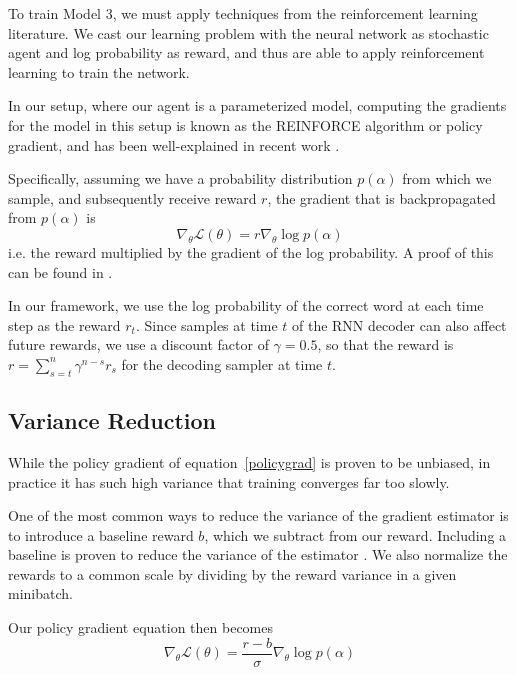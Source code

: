 \documentclass[11pt]{report}
\begin{document}
To train Model 3, we must apply techniques from the reinforcement learning literature. We cast our learning problem with the neural network as stochastic agent and log probability as reward, and thus are able to apply reinforcement learning to train the network.

In our setup, where our agent is a parameterized model, computing the gradients for the model in this setup is known as the REINFORCE algorithm \citep{williams1992reinforce} or policy gradient, and has been well-explained in recent work \citep{mnih2014visualattention, ba2015visualattention, schulman2015backprop}.

Specifically, assuming we have a probability distribution $p(\alpha)$ from which we sample, and subsequently receive reward $r$, the gradient that is backpropagated from $p(\alpha)$ is
\begin{equation}
\label{policygrad}
\nabla_\theta \mathcal{L}(\theta) = r \nabla_\theta \log p(\alpha)
\end{equation}
i.e. the reward multiplied by the gradient of the log probability. A proof of this can be found in \cite{williams1992reinforce}.

In our framework, we use the log probability of the correct word at each time step as the reward $r_t$. Since samples at time $t$ of the RNN decoder can also affect future rewards, we use a discount factor of $\gamma = 0.5$, so that the reward is $r = \sum_{s = t}^n \gamma^{n-s}r_s$ for the decoding sampler at time $t$.

\subsection{Variance Reduction}

While the policy gradient of equation~\ref{policygrad} is proven to be unbiased, in practice it has such high variance that training converges far too slowly.

One of the most common ways to reduce the variance of the gradient estimator is to introduce a baseline reward $b$, which we subtract from our reward. Including a baseline is proven to reduce the variance of the estimator \citep{mnih2014belief}. We also normalize the rewards to a common scale by dividing by the reward variance in a given minibatch.


Our policy gradient equation then becomes
\begin{equation}
\label{policygradbaseline}
\nabla_\theta \mathcal{L}(\theta) = \frac{r-b}{\sigma} \nabla_\theta \log p(\alpha)
\end{equation}
\end{document}
